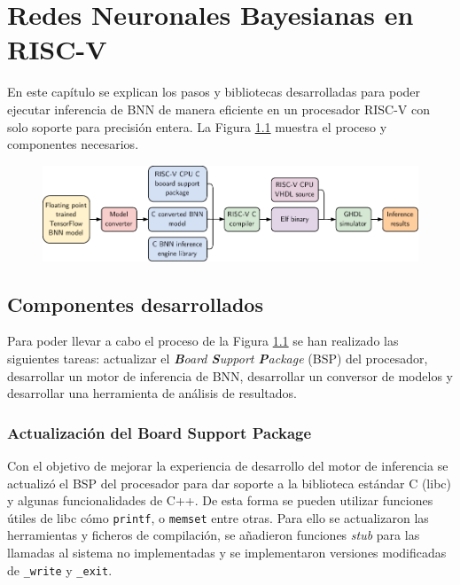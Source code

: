 \chapter{Redes Neuronales Bayesianas en RISC-V}

En este capítulo se explican los pasos y bibliotecas desarrolladas para poder ejecutar inferencia de BNN de manera eficiente en un procesador RISC-V con solo soporte para precisión entera. La Figura \ref{fig:experiment_pipeline} muestra el proceso y componentes necesarios.

\begin{figure}[h]
    \centering
    \includegraphics[width=\textwidth]{root/Imagenes/4_bnn_riscv/experiment_pipeline.pdf}
    \caption{\todo}
    \label{fig:experiment_pipeline}
\end{figure}

\section{Componentes desarrollados}

Para poder llevar a cabo el proceso de la Figura \ref{fig:experiment_pipeline} se han realizado las siguientes tareas: actualizar el \textit{\textbf{B}oard \textbf{S}upport \textbf{P}ackage} (BSP) del procesador, desarrollar un motor de inferencia de BNN, desarrollar un conversor de modelos y desarrollar una herramienta de análisis de resultados.

\subsection{Actualización del Board Support Package}

Con el objetivo de mejorar la experiencia de desarrollo del motor de inferencia se actualizó el BSP del procesador para dar soporte a la biblioteca estándar C (libc) y algunas funcionalidades de C++. De esta forma se pueden utilizar funciones útiles de libc cómo \texttt{printf}, o \texttt{memset} entre otras. Para ello se actualizaron las herramientas y ficheros de compilación, se añadieron funciones \textit{stub} para las llamadas al sistema no implementadas y se implementaron versiones modificadas de \texttt{\_write} y \texttt{\_exit}.

